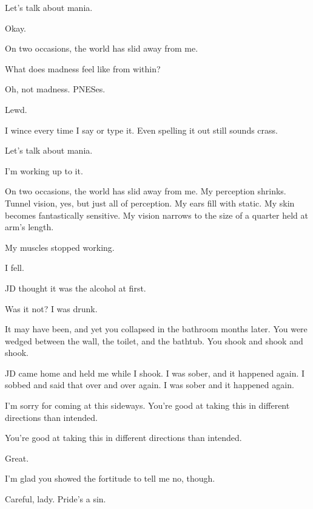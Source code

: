 \begin{ally}
Let's talk about mania.
\end{ally}
Okay.

\newpage


\noindent On two occasions, the world has slid away from me.

\begin{ally}
What does madness feel like from within?
\end{ally}
Oh, not madness. PNESes.

\begin{ally}
Lewd.
\end{ally}
I wince every time I say or type it. Even spelling it out still sounds crass.

\begin{ally}
Let's talk about mania.
\end{ally}
I'm working up to it.

On two occasions, the world has slid away from me. My perception shrinks. Tunnel vision, yes, but just all of perception. My ears fill with static. My skin becomes fantastically sensitive. My vision narrows to the size of a quarter held at arm's length.

My muscles stopped working.

I fell.

\begin{ally}
JD thought it was the alcohol at first.
\end{ally}
Was it not? I was drunk.

\begin{ally}
It may have been, and yet you collapsed in the bathroom months later. You were wedged between the wall, the toilet, and the bathtub. You shook and shook and shook.
\end{ally}
JD came home and held me while I shook. I was sober, and it happened again. I sobbed and said that over and over again. I was sober and it happened again.

I'm sorry for coming at this sideways. You're good at taking this in different directions than intended.

\begin{ally}
You're good at taking this in different directions than intended.
\end{ally}
Great.

\begin{ally}
I'm glad you showed the fortitude to tell me no, though.
\end{ally}
Careful, lady. Pride's a sin.

